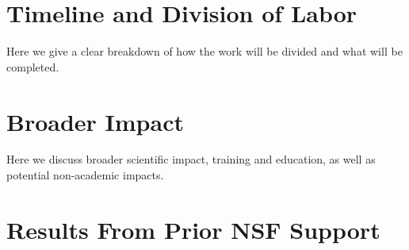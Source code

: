 \section{Timeline and Division of Labor}

Here we give a clear breakdown of how the work will be divided and what will be completed.

\section{Broader Impact}

Here we discuss broader scientific impact, training and education, as well as potential non-academic impacts.

\section{Results From Prior NSF Support}




